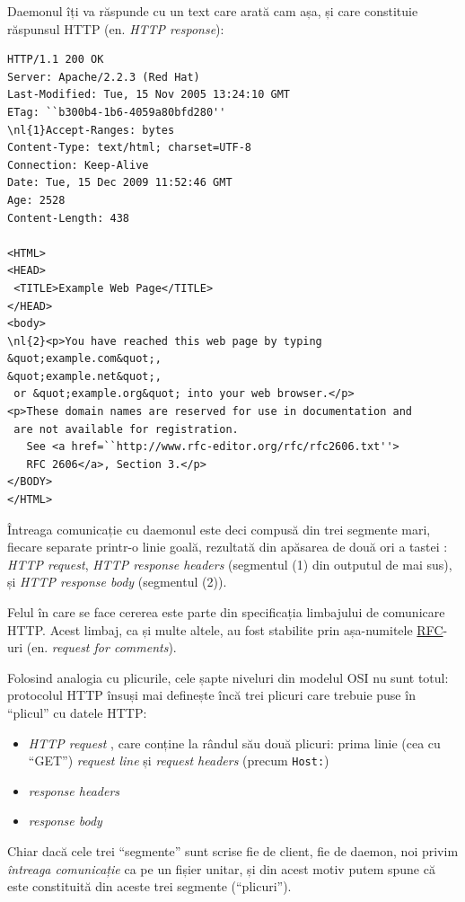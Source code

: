 Daemonul îți va răspunde cu un text care arată cam așa, și care constituie răspunsul
HTTP (en. \textsl{HTTP response}):
\begin{Verbatim}[commandchars=\\\{\}]
HTTP/1.1 200 OK
Server: Apache/2.2.3 (Red Hat)
Last-Modified: Tue, 15 Nov 2005 13:24:10 GMT
ETag: ``b300b4-1b6-4059a80bfd280''            
\nl{1}Accept-Ranges: bytes                        
Content-Type: text/html; charset=UTF-8      
Connection: Keep-Alive                      
Date: Tue, 15 Dec 2009 11:52:46 GMT         
Age: 2528                                   
Content-Length: 438

<HTML>
<HEAD>
 <TITLE>Example Web Page</TITLE>
</HEAD>                          
<body>                           
\nl{2}<p>You have reached this web page by typing &quot;example.com&quot;,
&quot;example.net&quot;,                                            
 or &quot;example.org&quot; into your web browser.</p>             
<p>These domain names are reserved for use in documentation and
 are not available for registration.
   See <a href=``http://www.rfc-editor.org/rfc/rfc2606.txt''>
   RFC 2606</a>, Section 3.</p>        
</BODY>                                                                           
</HTML>
\end{Verbatim}
Întreaga comunicație cu daemonul este deci compusă din trei segmente mari, fiecare separate
printr-o linie goală, rezultată din apăsarea de două ori a tastei :
\textsl{HTTP request}, \textsl{HTTP response headers} (segmentul (1) din outputul de mai sus),
și \textsl{HTTP response body} (segmentul (2)).

Felul în care se face cererea este parte din specificația
limbajului de comunicare HTTP. Acest limbaj, ca și multe altele, au fost stabilite
prin așa-numitele \href{http://en.wikipedia.org/wiki/Request_for_Comments}{RFC}-uri
(en. \textsl{request for comments}).

Folosind analogia cu plicurile, cele șapte niveluri din modelul OSI nu sunt totul:
protocolul HTTP însuși mai definește încă trei plicuri care trebuie puse în
``plicul'' cu datele HTTP:
\begin{itemize}
\item \textsl{HTTP request}
, care conține la rândul
său două plicuri: prima linie (cea cu ``GET'') \textsl{request line} și
\textsl{request headers} (precum \texttt{Host:})
\item \textsl{response headers}
\item \textsl{response body}
\end{itemize}
Chiar dacă cele trei ``segmente'' sunt scrise fie de client, fie de daemon,
noi privim \textit{întreaga comunicație} ca pe un fișier unitar, și din acest motiv
putem spune că este constituită din aceste trei segmente (``plicuri'').

